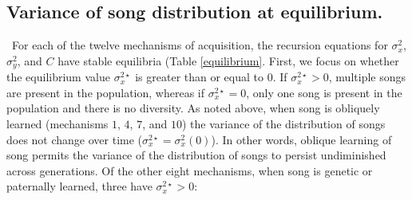 \documentclass[12pt]{article}
\begin{document}
\subsection*{Variance of song distribution at equilibrium. }
\ For each of the twelve mechanisms of acquisition, the recursion equations for $\sigma_x^2$, $\sigma_y^2$, and $C$ have stable equilibria (Table \ref{equilibrium}. 
First, we focus on whether the equilibrium value $\sigma_x^{2\star}$ is greater than or equal to $0$. If $\sigma_x^{2\star}>0$, multiple songs are present in the population, whereas if $\sigma_x^{2\star}=0$, only one song is present in the population and there is no diversity. As noted above, when song is obliquely learned (mechanisms $1$, $4$, $7$, and $10$) the variance of the distribution of songs does not change over time ($\sigma_x^{2\star}=\sigma_x^2(0)$). In other words, oblique learning of song permits the variance of the distribution of songs to persist undiminished across generations. Of the other eight mechanisms, when song is genetic or paternally learned, three have $\sigma_x^{2\star}>0$:
\end{document}
